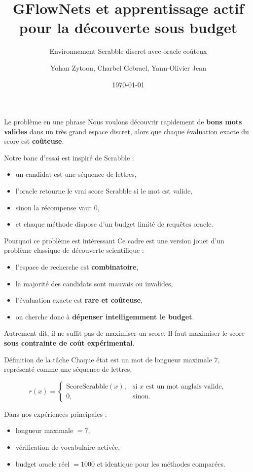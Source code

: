 \documentclass[aspectratio=169,10pt]{beamer}
\title{GFlowNets et apprentissage actif pour la découverte sous budget}
\subtitle{Environnement Scrabble discret avec oracle coûteux}
\author{Yohan Zytoon, Charbel Gebrael, Yann-Olivier Jean}
\institute{IFT 3710 / IFT 6759 --- Hiver 2026}
\date{\today}
\begin{document}
\begin{frame}
  \titlepage
\end{frame}

\begin{frame}{Le problème en une phrase}
\justifying
Nous voulons découvrir rapidement de \textbf{bons mots valides} dans un très
grand espace discret, alors que chaque évaluation exacte du score est
\textbf{coûteuse}.

\vspace{0.6em}
Notre banc d'essai est inspiré de Scrabble :
\begin{itemize}
  \item un candidat est une séquence de lettres,
  \item l'oracle retourne le vrai score Scrabble si le mot est valide,
  \item sinon la récompense vaut \(0\),
  \item et chaque méthode dispose d'un budget limité de requêtes oracle.
\end{itemize}
\end{frame}

\begin{frame}{Pourquoi ce problème est intéressant}
\justifying
Ce cadre est une version jouet d'un problème classique de découverte
scientifique :
\begin{itemize}
  \item l'espace de recherche est \textbf{combinatoire},
  \item la majorité des candidats sont mauvais ou invalides,
  \item l'évaluation exacte est \textbf{rare et coûteuse},
  \item on cherche donc à \textbf{dépenser intelligemment le budget}.
\end{itemize}

\vspace{0.5em}
Autrement dit, il ne suffit pas de maximiser un score. Il faut maximiser le
score \textbf{sous contrainte de coût expérimental}.
\end{frame}

\begin{frame}{Définition de la tâche}
\justifying
Chaque état est un mot de longueur maximale \(7\), représenté comme une
séquence de lettres.

\[
r(x)=
\begin{cases}
\text{ScoreScrabble}(x), & \text{si } x \text{ est un mot anglais valide},\\[0.3em]
0, & \text{sinon.}
\end{cases}
\]

\vspace{0.5em}
Dans nos expériences principales :
\begin{itemize}
  \item longueur maximale \(=7\),
  \item vérification de vocabulaire activée,
  \item budget oracle réel \(=1000\) et identique pour les méthodes comparées.
\end{itemize}
\end{frame}
\end{document}
